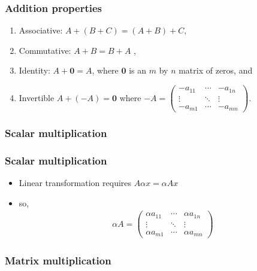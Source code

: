 \documentclass[compress]{beamer}
\newcommand{\gmatrix}[1]{\begin{pmatrix} {#1}_{11} & \cdots &
    {#1}_{1n} \\ \vdots & \ddots & \vdots \\ {#1}_{m1} & \cdots &
    {#1}_{mn} \end{pmatrix}}
\theoremstyle{definition}
\begin{document}
\begin{frame}
  \frametitle{Addition properties}
  \begin{enumerate}
  \item Associative: $A+(B + C) = (A+B) + C$,
  \item Commutative: $A + B = B + A$ ,
  \item Identity: $A + \mathbf{0} = A$, where $\mathbf{0}$ is an $m$ by
    $n$ matrix of zeros, and
  \item Invertible $A + (-A) = \mathbf{0}$ where $-A = \gmatrix{-a}$.
  \end{enumerate}
\end{frame}

\subsubsection{Scalar multiplication}
\begin{frame}
  \frametitle{Scalar multiplication}
  \begin{itemize}
  \item Linear transformation requires $A \alpha x = \alpha A x$
  \item so,
    \begin{align*}
      \alpha A = \begin{pmatrix} \alpha a_{11} & \cdots &
        \alpha a_{1n} \\ \vdots & \ddots & \vdots \\ \alpha a_{m1} & \cdots &
        \alpha a_{mn} \end{pmatrix}
    \end{align*}
  \end{itemize}
\end{frame}

\subsubsection{Matrix multiplication}
\end{document}
